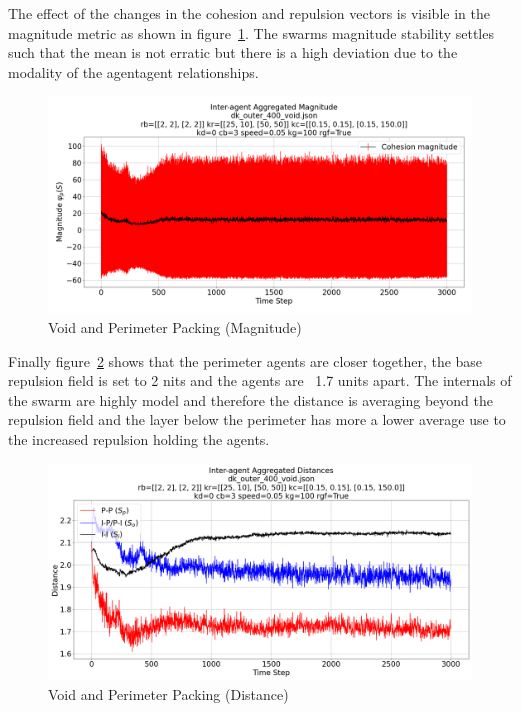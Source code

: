 \documentclass[12pt,a4paper]{IEEEtran}
\begin{document}
The effect of the changes in the cohesion and repulsion vectors is visible in the magnitude metric as shown in figure~\ref{fig:voidPerimMagnitude}. The swarms magnitude stability settles such that the mean is not erratic but there is a high deviation due to the modality of the agent\textrightarrow agent relationships.

\begin{figure}[H]
	\begin{center}
		\includegraphics[width=1.0\linewidth]{figures/voidPerimMagnitude}
	\end{center}
	\caption{Void and Perimeter Packing (Magnitude)\label{fig:voidPerimMagnitude}}
\end{figure}

Finally figure~\ref{fig:voidPerimDistance} shows that the perimeter agents are closer together, the base repulsion field is set to 2 nits and the agents are ~1.7 units apart. The internals of the swarm are highly model and therefore the distance is averaging beyond the repulsion field and the layer below the perimeter has more a lower average use to the increased repulsion holding the agents.

\begin{figure}[H]
	\begin{center}
		\includegraphics[width=1.0\linewidth]{figures/voidPerimDistance}
	\end{center}
	\caption{Void and Perimeter Packing (Distance)\label{fig:voidPerimDistance}}
\end{figure}
\end{document}
